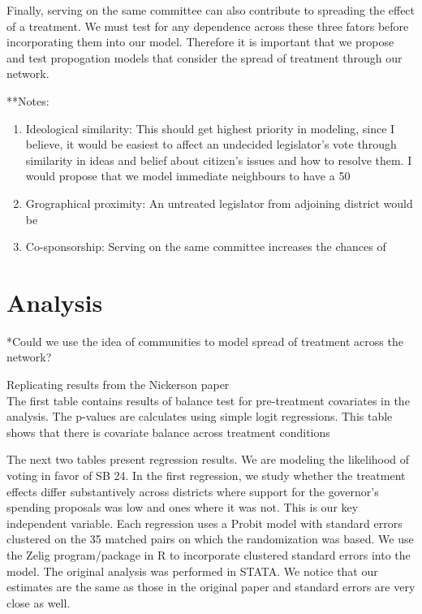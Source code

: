 \documentclass[12pt]{article}
\begin{document}
Finally, serving on the same committee can also contribute to spreading the effect of a treatment. We must test for any dependence across these three fators before incorporating them into our model. Therefore it is important that we propose and test propogation models that consider the spread of treatment through our network.


**Notes:
\begin{enumerate}

\item Ideological similarity: This should get highest priority in modeling, since I believe, it would be easiest to affect an undecided legislator's vote through similarity in ideas and belief about citizen's issues and how to resolve them. I would propose that we model immediate neighbours to have a 50%
\item Grographical proximity: An untreated legislator from adjoining district would be 
\item Co-sponsorship: Serving on the same committee increases the chances of 

\end{enumerate}



\section{Analysis}

*Could we use the idea of communities to model spread of treatment across the network?


Replicating results from the Nickerson paper \\


The first table contains results of balance test for pre-treatment covariates in the analysis. The p-values are calculates using simple logit regressions. This table shows that there is covariate balance across treatment conditions




The next two tables present regression results. We are modeling the likelihood of voting in favor of SB 24. In the first regression, we study whether the treatment effects differ substantively across districts where support for the governor's spending proposals was low and ones where it was not. This is our key independent variable. Each regression uses a Probit model with standard errors clustered on the 35 matched pairs on which the randomization was based. We use the Zelig program/package in R to incorporate clustered standard errors into the model. The original analysis was performed in STATA. We notice that our estimates are the same as those in the original paper and standard errors are very close as well.
\end{document}
